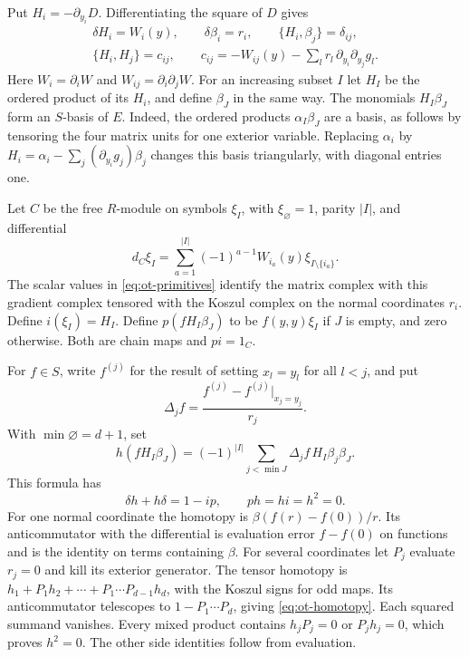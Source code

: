 Put \(H_i=-\partial_{y_i}D\). Differentiating the square of \(D\)
gives
\begin{gather}
 \delta H_i=W_i(y),\qquad \delta\beta_i=r_i,\qquad
 \{H_i,\beta_j\}=\delta_{ij},\label{eq:ot-primitives}\\
 \{H_i,H_j\}=c_{ij},\qquad
 c_{ij}=-W_{ij}(y)-\sum_l r_l\,\partial_{y_i}\partial_{y_j}g_l.
 \label{eq:ot-clifford}
\end{gather}
Here \(W_i=\partial_iW\) and \(W_{ij}=\partial_i\partial_jW\).
For an increasing subset \(I\) let \(H_I\) be the ordered product
of its \(H_i\), and define \(\beta_J\) in the same way.
The monomials \(H_I\beta_J\) form an \(S\)-basis of \(E\).
Indeed, the ordered products \(\alpha_I\beta_J\) are a basis,
as follows by tensoring the four matrix units for one exterior
variable. Replacing \(\alpha_i\) by
\(H_i=\alpha_i-\sum_j(\partial_{y_i}g_j)\beta_j\)
changes this basis triangularly, with diagonal entries one.

Let \(C\) be the free \(R\)-module on symbols \(\xi_I\), with
\(\xi_\varnothing=1\), parity \(|I|\), and differential
\[
 d_C\xi_I=\sum_{a=1}^{|I|}(-1)^{a-1}W_{i_a}(y)
                 \xi_{I\setminus\{i_a\}}.
\]
The scalar values in \eqref{eq:ot-primitives} identify the matrix
complex with this gradient complex tensored with the Koszul
complex on the normal coordinates \(r_i\).
Define \(i(\xi_I)=H_I\). Define \(p(fH_I\beta_J)\) to be
\(f(y,y)\xi_I\) if \(J\) is empty, and zero otherwise.
Both are chain maps and \(pi=1_C\).

For \(f\in S\), write \(f^{(j)}\) for the result of setting
\(x_l=y_l\) for all \(l<j\), and put
\[
 \Delta_j f=\frac{f^{(j)}-f^{(j)}|_{x_j=y_j}}{r_j}.
\]
With \(\min\varnothing=d+1\), set
\begin{equation}\label{eq:ot-homotopy}
 h(fH_I\beta_J)=(-1)^{|I|}
       \sum_{j<\min J}\Delta_j f\,H_I\beta_j\beta_J.
\end{equation}
This formula has
\[
 \delta h+h\delta=1-ip,\qquad ph=hi=h^2=0.
\]
For one normal coordinate the homotopy is
\(\beta(f(r)-f(0))/r\). Its anticommutator with the differential
is evaluation error \(f-f(0)\) on functions and is the identity
on terms containing \(\beta\). For several coordinates let \(P_j\)
evaluate \(r_j=0\) and kill its exterior generator. The tensor
homotopy is \(h_1+P_1h_2+\cdots+P_1\cdots P_{d-1}h_d\),
with the Koszul signs for odd maps. Its anticommutator telescopes
to \(1-P_1\cdots P_d\), giving \eqref{eq:ot-homotopy}.
Each squared summand vanishes. Every mixed product contains
\(h_jP_j=0\) or \(P_jh_j=0\), which proves \(h^2=0\).
The other side identities follow from evaluation.

